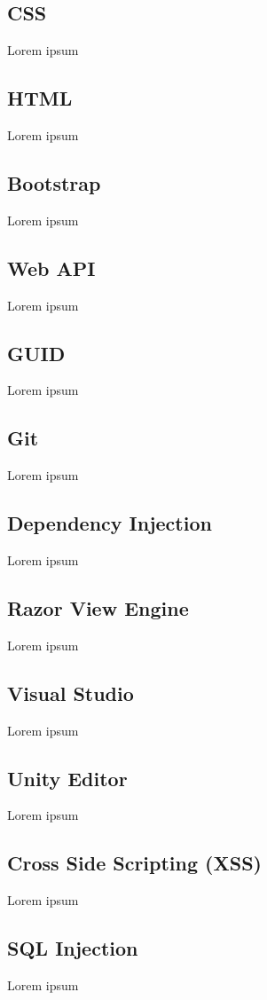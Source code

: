  \subsection*{CSS}
Lorem ipsum
\subsection*{HTML}
Lorem ipsum
\subsection*{Bootstrap}
Lorem ipsum
\subsection*{Web API}
Lorem ipsum
\subsection*{GUID}
Lorem ipsum
\subsection*{Git}
Lorem ipsum
\subsection*{Dependency Injection}
Lorem ipsum
\subsection*{Razor View Engine}
Lorem ipsum
\subsection*{Visual Studio}
Lorem ipsum
\subsection*{Unity Editor}
Lorem ipsum
\subsection*{Cross Side Scripting (XSS)}
Lorem ipsum
\subsection*{SQL Injection}
Lorem ipsum

